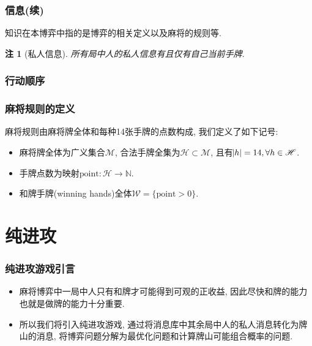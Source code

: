\documentclass[xcolor=dvipsnames]{ctexbeamer}
\newtheorem{note}{注}[section]
\newcommand{\mahjong}{\mathscr{M}}
\newcommand{\point}{\mathrm{point}}
\newcommand{\Hand}{\mathscr{H}}
\newcommand{\hand}{h}
\begin{document}
    \begin{frame}
        \frametitle{信息(续)}
        \begin{definition}[知识]
            知识在本博弈中指的是博弈的相关定义以及麻将的规则等.
        \end{definition}
        \begin{note}[私人信息]
            所有局中人的私人信息有且仅有自己当前手牌.
        \end{note}
    \end{frame}
    
    \begin{frame}
        \frametitle{行动顺序}

    \end{frame}

    \begin{frame}
        \frametitle{麻将规则的定义}
        \begin{definition}[麻将规则]
            麻将规则由麻将牌全体和每种14张手牌的点数构成, 我们定义了如下记号:
            \begin{itemize}
                \item 麻将牌全体为广义集合$\mahjong$,
                    合法手牌全集为$\Hand\subset\mahjong$,
                    且有$\abs{\hand}=14, \forall{\hand\in\Hand}$.
                \item 手牌点数为映射$\point: \Hand\rightarrow\mathbb{N}$.
                \item 和牌手牌(winning hands)全体$\mathscr{W}=\{\point>0\}$.
            \end{itemize}
        \end{definition}
    \end{frame}

    \section{纯进攻}

    \begin{frame}
        \frametitle{纯进攻游戏引言}
        \begin{itemize}
            \item 麻将博弈中一局中人只有和牌才可能得到可观的正收益,
                因此尽快和牌的能力也就是做牌的能力十分重要.
            \item 所以我们将引入纯进攻游戏,
                通过将消息库中其余局中人的私人消息转化为牌山的消息,
                将博弈问题分解为最优化问题和计算牌山可能组合概率的问题.
        \end{itemize}
    \end{frame}
\end{document}

